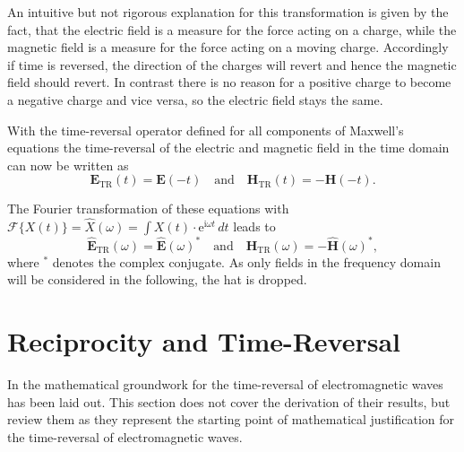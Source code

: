 An intuitive but not rigorous explanation for this transformation is given by the fact, that the electric field is a measure for the force acting on a charge, while the magnetic field is a measure for the force acting on a moving charge. 
Accordingly if time is reversed, the direction of the charges will revert and hence the magnetic field should revert. 
In contrast there is no reason for a positive charge to become a negative charge and vice versa, so the electric field stays the same.

With the time-reversal operator defined for all components of Maxwell's equations the time-reversal of the electric and magnetic field in the time domain can now be written as
\begin{equation}
    \bm{E}_{\text{TR}}(t) = \bm{E}(-t) \quad \text{and} \quad \bm{H}_{\text{TR}}(t) = -\bm{H}(-t).
\end{equation}

The Fourier transformation of these equations with \(\mathcal{F}\{X(t)\} = \hat{X}(\omega) = \int X(t) \cdot \mathrm{e}^{\mathrm{i}\omega t} \, dt\) leads to
\begin{equation}
    \hat{\bm{E}}_{\text{TR}}(\omega) = \hat{\bm{E}}{(\omega)}^* \quad \text{and} \quad \hat{\bm{H}}_{\text{TR}}(\omega) = -\hat{\bm{H}}{(\omega)}^*,
\end{equation}
where \(^*\) denotes the complex conjugate. 
As only fields in the frequency domain will be considered in the following, the hat is dropped.



\section{Reciprocity and Time-Reversal}\label{sec:math_foundations_em_tr}
In \parencite{de_rosny_theory_2010} the mathematical groundwork for the time-reversal of electromagnetic waves has been laid out.
This section does not cover the derivation of their results, but review them as they represent the starting point of mathematical justification for the time-reversal of electromagnetic waves.

